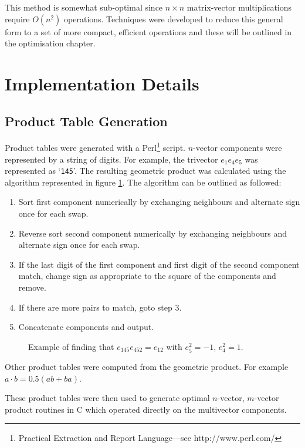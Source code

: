 This method is somewhat sub-optimal since $n \times n$ matrix-vector
multiplications require $O(n^2)$ operations. Techniques were developed to
reduce this general form to a set of more compact, efficient operations and
these will be outlined in the optimisation chapter.


\section{Implementation Details}

\subsection{Product Table Generation}

Product tables were generated with a Perl\footnote{Practical Extraction and Report
Language---see http://www.perl.com/} script. $n$-vector components were represented
by a string of digits. For example, the trivector $e_1e_4e_5$ was represented as
`{\tt 145}'. The resulting geometric product was calculated using the algorithm
represented in figure \ref{fig:symbolic}. The algorithm 
can be outlined as followed:

\begin{enumerate}
\item Sort first component numerically by exchanging neighbours and alternate sign
once for each swap.
\item Reverse sort second component numerically by exchanging neighbours and alternate sign
once for each swap.
\item If the last digit of the first component and first digit of the second
component match, change sign as appropriate to the square of the components and
remove.
\item If there are more pairs to match, goto step 3.
\item Concatenate components and output.
\end{enumerate}

\begin{figure}
\centering
{}
\caption{Example of finding that $e_{145}e_{452} = e_{12}$ with $e_5^2 = -1$, $e_4^2 = 1$.
\label{fig:symbolic}}
\end{figure}

Other product tables were computed from the geometric product. For example 
$a \cdot b = 0.5 (ab + ba)$.

These product tables were then used to generate optimal $n$-vector, $m$-vector product 
routines in C which operated directly on the multivector components.


